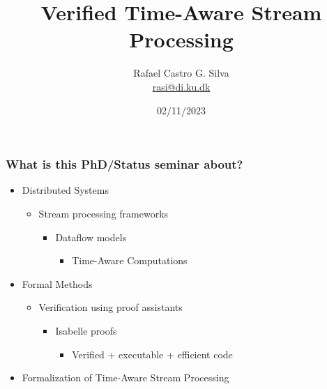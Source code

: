 \documentclass[aspectratio=169,10pt]{beamer}
\title[Verified Time-Aware Stream Processing]{Verified Time-Aware Stream Processing}
\author[Rafael Castro]{
  Rafael Castro G. Silva\\\medskip
  {\small \url{rasi@di.ku.dk}}}
\date{02/11/2023}
\institute[UCPH]{
  Department of Computer Science \\
  University of Copenhagen}
\begin{document}
\begin{frame}
  \titlepage

\end{frame}

\begin{frame}[fragile]
  \frametitle{What is this PhD/Status seminar about?}
  \begin{itemize}
          \pause
    \item Distributed Systems
          \begin{itemize}
            \item Stream processing frameworks
                  \begin{itemize}
                    \item Dataflow models
                          \begin{itemize}
                            \item Time-Aware Computations
                          \end{itemize}
                  \end{itemize}
          \end{itemize}
          \pause
    \item Formal Methods
          \begin{itemize}
            \item Verification using proof assistants
                  \begin{itemize}
                    \item Isabelle proofs
                          \begin{itemize}
                            \item Verified + executable + efficient code
                          \end{itemize}
                  \end{itemize}
          \end{itemize}
    \item Formalization of Time-Aware Stream Processing
  \end{itemize}
\end{frame}

\end{document}
